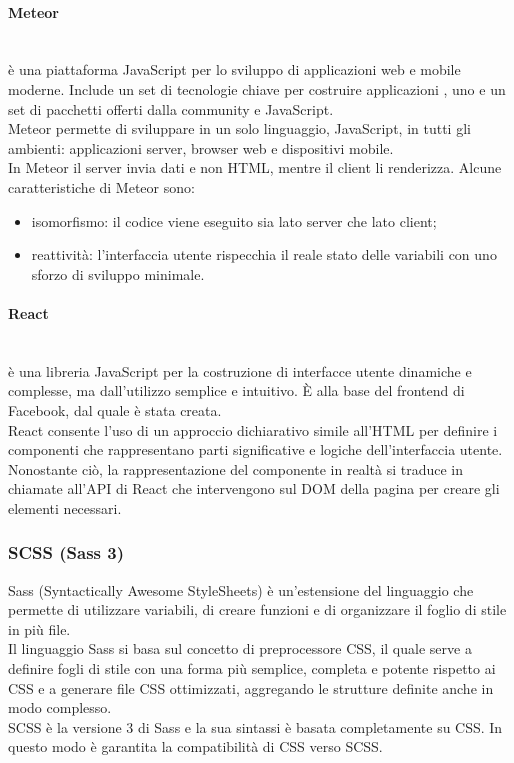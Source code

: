 \paragraph{Meteor}\mbox{}\\
 è una piattaforma JavaScript  per lo sviluppo di applicazioni web e mobile moderne. Include un set di tecnologie chiave per costruire applicazioni , uno  e un set di pacchetti offerti dalla community  e JavaScript.\\
Meteor permette di sviluppare in un solo linguaggio, JavaScript, in tutti gli ambienti: applicazioni server, browser web e dispositivi mobile.\\
In Meteor il server invia dati e non HTML, mentre il client li renderizza.
Alcune caratteristiche di Meteor sono:
\begin{itemize}
	\item isomorfismo: il codice viene eseguito sia lato server che lato client;
	\item reattività: l'interfaccia utente rispecchia il reale stato delle variabili con uno sforzo di sviluppo minimale.
\end{itemize}

\paragraph{React}\mbox{}\\
 è una libreria JavaScript per la costruzione di interfacce utente dinamiche e complesse, ma dall'utilizzo semplice e intuitivo. \`{E} alla base del frontend di Facebook, dal quale è stata creata.\\
React consente l'uso di un approccio dichiarativo simile all'HTML per definire i componenti che rappresentano parti significative e logiche dell'interfaccia utente. Nonostante ciò, la rappresentazione del componente in realtà si traduce in chiamate all'API di React che intervengono sul DOM della pagina per creare gli elementi necessari.

\subsubsection{SCSS (Sass 3)}
Sass (Syntactically Awesome StyleSheets) è un'estensione del linguaggio  che permette di utilizzare variabili, di creare funzioni e di organizzare il foglio di stile in più file.\\
Il linguaggio Sass si basa sul concetto di preprocessore CSS, il quale serve a definire fogli di stile con una forma più semplice, completa e potente rispetto ai CSS e a generare file CSS ottimizzati, aggregando le strutture definite anche in modo complesso.\\
SCSS è la versione 3 di Sass e la sua sintassi è basata completamente su CSS. In questo modo è garantita la compatibilità di CSS verso SCSS.

